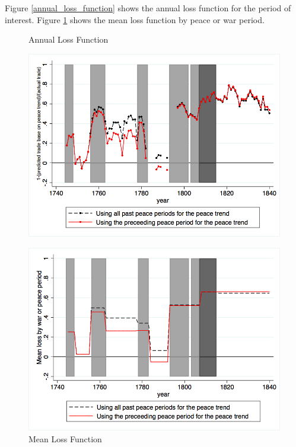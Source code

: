 \documentclass[12pt,a4paper,notitlepage]{article}
\begin{document}
Figure \ref{annual_loss_function} shows the annual loss function for the period of interest. Figure \ref{mean_loss_function} shows the mean loss function by peace or war period.
\begin{figure}[H]
	\begin{minipage}[b]{0.45\linewidth}
		\caption{Annual Loss Function}
		\centering
		\label{annual_loss_function}
		\includegraphics[scale=.3]		{Annual_loss_function.png}
	\end{minipage}
	 \hspace{0.5cm}
     \begin{minipage}[b]{0.45\linewidth}
	\caption{Mean Loss Function}
	\label{mean_loss_function}
	\includegraphics[scale=.3]{Mean_loss_function.png}
	\end{minipage}
\end{figure}
\end{document}
